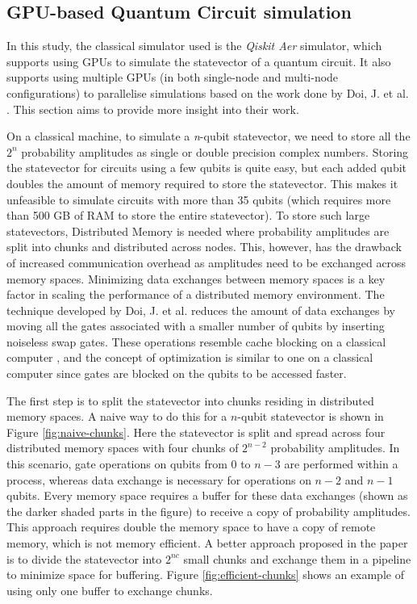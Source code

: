 \subsection{GPU-based Quantum Circuit simulation}
\label{sec:gpu-simulation}

In this study, the classical simulator used is the \emph{Qiskit Aer} \cite{qiskitAerGPU} simulator, which supports using GPUs to simulate the statevector of a quantum circuit. It also supports using multiple GPUs (in both single-node and multi-node configurations) to parallelise simulations based on the work done by Doi, J. et al. \cite{qiskitGPUpaper}. This section aims to provide more insight into their work.

On a classical machine, to simulate a \emph{n}-qubit statevector, we need to store all the $2^{n}$ probability amplitudes as single or double precision complex numbers. Storing the statevector for circuits using a few qubits is quite easy, but each added qubit doubles the amount of memory required to store the statevector. This makes it unfeasible to simulate circuits with more than 35 qubits (which requires more than 500 GB of RAM to store the entire statevector). To store such large statevectors, Distributed Memory is needed where probability amplitudes are split into chunks and distributed across nodes. This, however, has the drawback of increased communication overhead as amplitudes need to be exchanged across memory spaces. Minimizing data exchanges between memory spaces is a key factor in scaling the performance of a distributed memory environment. The technique developed by Doi, J. et al. reduces the amount of data exchanges by moving all the gates associated with a smaller number of qubits by inserting noiseless swap gates. These operations resemble cache blocking on a classical computer \cite{10.5555/2568134}, and the concept of optimization is similar to one on a classical computer since gates are blocked on the qubits to be accessed faster.  

The first step is to split the statevector into chunks residing in distributed memory spaces. A naive way to do this for a $n$-qubit statevector is shown in Figure \ref{fig:naive-chunks}. Here the statevector is split and spread across four distributed memory spaces with four chunks of $2^{n-2}$ probability amplitudes. In this scenario, gate operations on qubits from $0$ to $n-3$ are performed within a process, whereas data exchange is necessary for operations on $n-2$ and $n-1$ qubits. Every memory space requires a buffer for these data exchanges (shown as the darker shaded parts in the figure) to receive a copy of probability amplitudes. This approach requires double the memory space to have a copy of remote memory, which is not memory efficient. A better approach proposed in the paper is to divide the statevector into $2^{nc}$ small chunks and exchange them in a pipeline to minimize space for buffering. Figure \ref{fig:efficient-chunks} shows an example of using only one buffer to exchange chunks.  



